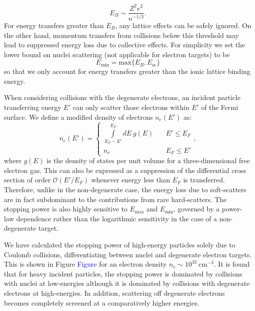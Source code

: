 \documentclass[twocolumn,showpacs,preprintnumbers,amsmath,amssymb,prd]{revtex4}
\begin{document}
\begin{equation}
E_B \sim \frac{Z^2 e^2}{n^{-1/3}}.
\end{equation}
For energy transfers greater than $E_B$, any lattice effects can be safely ignored. On the other hand, momentum transfers from collisions below this threshold may lead to suppressed energy loss due to collective effects. For simplicity we set the lower bound on nuclei scattering (not applicable for electron targets) to be
\begin{equation}
E_{\text{min}} = \text{max} \{E_B,E_{\text{sc}}\}
\end{equation}
so that we only account for energy transfers greater than the ionic lattice binding energy.

When considering collisions with the degenerate electrons, an incident particle transferring energy $E'$ can only scatter those electrons within $E'$ of the Fermi surface. We define a modified density of electrons $n_e(E')$ as:
\begin{equation}
n_e(E') = \left\{
        \begin{array}{ll}
            \displaystyle \int \limits_{E_F -E'}^{E_F}dE ~g(E) & \quad E' \leq E_F \\
            n_e & \quad E_F \leq E'
        \end{array}
    \right.,
\end{equation}
where $g(E)$ is the density of states per unit volume for a three-dimensional free electron gas. This can also be expressed as a suppression of the differential cross section of order $\mathcal{O}(E'/E_F)$ whenever energy less than $E_F$ is transferred. Therefore, unlike in the non-degenerate case, the energy loss due to soft-scatters are in fact subdominant to the contributions from rare hard-scatters. The stopping power is also highly sensitive to $E_{\text{max}}$ and $E_{\text{min}}$, governed by a power-law dependence rather than the logarithmic sensitivity in the case of a non-degenerate target.

We have calculated the stopping power of high-energy particles solely due to Coulomb collisions, differentiating between nuclei and degenerate electron targets. This is shown in Figure \textcolor{blue}{Figure} for an electron density $n_e \sim 10^{33} ~\text{cm}^{-3}$. It is found that for heavy incident particles, the stopping power is dominated by collisions with nuclei at low-energies although it is dominated by collisions with degenerate electrons at high-energies. In addition, scattering off degenerate electrons becomes completely screened at a comparatively higher energies.
\end{document}
